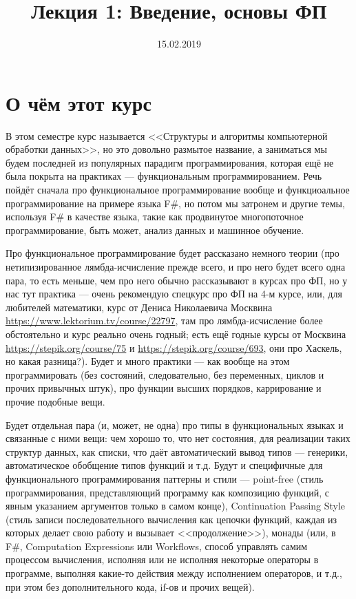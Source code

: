 \documentclass[a5paper]{article}
\title{Лекция 1: Введение, основы ФП}
\date{15.02.2019}
\begin{document}
\maketitle
\thispagestyle{empty}

\section{О чём этот курс}
В этом семестре курс называется <<Структуры и алгоритмы компьютерной обработки данных>>, но это довольно размытое название, а заниматься мы будем последней из популярных парадигм программирования, которая ещё не была покрыта на практиках --- функциональным программированием. Речь пойдёт сначала про функциональное программирование вообще и функциоальное программирование на примере языка F\#, но потом мы затронем и другие темы, используя F\# в качестве языка, такие как продвинутое многопоточное программирование, быть может, анализ данных и машинное обучение.

Про функциональное программирование будет рассказано немного теории (про нетипизированное лямбда-исчисление прежде всего, и про него будет всего одна пара, то есть меньше, чем про него обычно рассказывают в курсах про ФП, но у нас тут практика --- очень рекомендую спецкурс про ФП на 4-м курсе, или, для любителей математики, курс от Дениса Николаевича Москвина \url{https://www.lektorium.tv/course/22797}, там про лямбда-исчисление более обстоятельно и курс реально очень годный; есть ещё годные курсы от Москвина \url{https://stepik.org/course/75} и \url{https://stepik.org/course/693}, они про Хаскель, но какая разница?). Будет и много практики --- как вообще на этом программировать (без состояний, следовательно, без переменных, циклов и прочих привычных штук), про функции высших порядков, каррирование и прочие подобные вещи.

Будет отдельная пара (и, может, не одна) про типы в функциональных языках и связанные с ними вещи: чем хорошо то, что нет состояния, для реализации таких структур данных, как списки, что даёт автоматический вывод типов --- генерики, автоматическое обобщение типов функций и т.д. Будут и специфичные для функционального программирования паттерны и стили --- point-free (стиль программирования, представляющий программу как композицию функций, с явным указанием аргументов только в самом конце), Continuation Passing Style (стиль записи последовательного вычисления как цепочки функций, каждая из которых делает свою работу и вызывает <<продолжение>>), монады (или, в F\#, Computation Expressions или Workflows, способ управлять самим процессом вычисления, исполняя или не исполняя некоторые операторы в программе, выполняя какие-то действия между исполнением операторов, и т.д., при этом без дополнительного кода, if-ов и прочих вещей).
\end{document}
